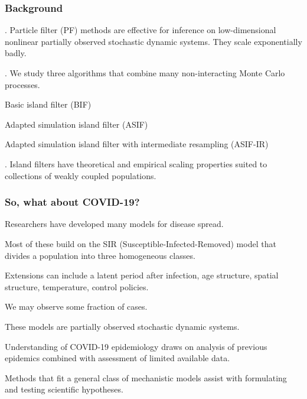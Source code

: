 \documentclass{beamer}
\begin{document}
\begin{frame}
  \frametitle{Background}

  . Particle filter (PF) methods are effective for inference on low-dimensional nonlinear partially observed stochastic dynamic systems. They scale exponentially badly.

  \vspace{10mm}
  
  . We study three algorithms that combine many non-interacting Monte Carlo processes.

  \vspace{3mm}
  
  \begin{myitemize}
  \item Basic island filter (BIF)
  \item Adapted simulation island filter (ASIF)
    \item Adapted simulation island filter with intermediate resampling (ASIF-IR)
  \end{myitemize}

  \vspace{10mm}

  . Island filters have theoretical and empirical scaling properties suited to collections of weakly coupled populations.

\end{frame}
\begin{frame}

  \frametitle{So, what about COVID-19?}

  \begin{myitemize}
  \item Researchers have developed many models for disease spread.
  \item Most of these build on the SIR (Susceptible-Infected-Removed) model that divides a population into three homogeneous classes.
    \item Extensions can include a latent period after infection, age structure, spatial structure, temperature, control policies.
    \item We may observe some fraction of cases.
    \item These models are partially observed stochastic dynamic systems.      
    \item Understanding of COVID-19 epidemiology draws on analysis of previous epidemics combined with assessment of limited available data.
      \item Methods that fit a general class of mechanistic models assist with formulating and testing scientific hypotheses.
      \end{myitemize}

\end{frame}
\end{document}
